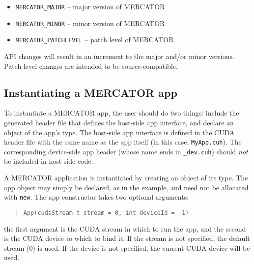 \documentclass[11pt]{article}
\begin{document}
\begin{itemize}

\item \texttt{MERCATOR_MAJOR} -- major version of MERCATOR

\item \texttt{MERCATOR_MINOR} -- minor version of MERCATOR

\item \texttt{MERCATOR_PATCHLEVEL} -- patch level of MERCATOR

\end{itemize}

API changes will result in an increment to the major and/or minor
versions.  Patch level changes are intended to be source-compatible.


\subsection{Instantiating a MERCATOR app}

To instantiate a MERCATOR app, the user should do two things: include
the generated header file that defines the host-side app interface,
and declare an object of the app's type.  The host-side app interface
is defined in the CUDA header file with the same name as the app
itself (in this case, \texttt{MyApp.cuh}).  The corresponding
device-side app header (whose name ends in \texttt{_dev.cuh}) should
\emph{not} be included in host-side code.


A MERCATOR application is instantiated by creating an object of its
type.  The app object may simply be declared, as in the example, and
need not be allocated with \texttt{new}.  The app constructor takes
two optional arguments:
\begin{quote}
\texttt{App(cudaStream_t stream = 0, int deviceId = -1)}
\end{quote}
the first argument is the CUDA stream in which to run the app, and
the second is the CUDA device to which to bind it.  If the stream is
not specified, the default stream (0) is used.  If the device is not
specified, the current CUDA device will be used.
\end{document}
